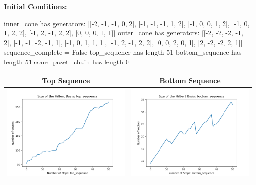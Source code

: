 \documentclass[10pt]{article}
\begin{document}
\textbf{Initial Conditions:}
\begin{SAGE}
inner_cone has generators: 
[[-2, -1, -1, 0, 2], [-1, -1, -1, 1, 2], [-1, 0, 0, 1, 2], [-1, 0, 1, 2, 2], [-1, 2, -1, 2, 2], [0, 0, 0, 1, 1]]
outer_cone has generators: 
[[-2, -2, -2, -1, 2], [-1, -1, -2, -1, 1], [-1, 0, 1, 1, 1], [-1, 2, -1, 2, 2], [0, 0, 2, 0, 1], [2, -2, -2, 2, 1]]
	sequence_complete = False
	top_sequence has length 51
	bottom_sequence has length 51
	cone_poset_chain has length 0

\end{SAGE}
\begin{tabular}{c|c}
\textbf{Top Sequence} & \textbf{Bottom Sequence} \\ \hline 
\begin{minipage}{.45\textwidth}
\includegraphics[width=\textwidth]{"DATA/5d/6 generators 2 bound C alternating/top_sequence SIZE"}
\end{minipage} &
\begin{minipage}{.45\textwidth}
\includegraphics[width=\textwidth]{"DATA/5d/6 generators 2 bound C alternating/bottom_sequence SIZE"}

\end{minipage}
\end{tabular}
\end{document}
